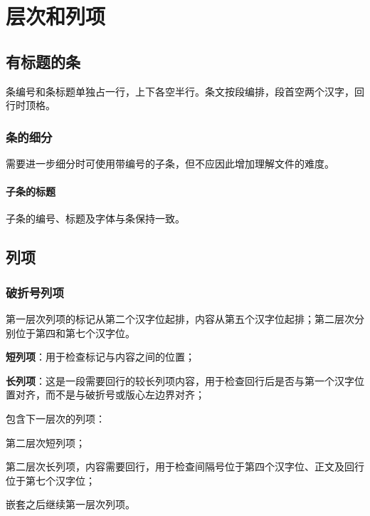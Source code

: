 \chapter{层次和列项}
\section{有标题的条}
条编号和条标题单独占一行，上下各空半行。条文按段编排，段首空两个汉字，回行时顶格。

\subsection{条的细分}
需要进一步细分时可使用带编号的子条，但不应因此增加理解文件的难度。

\subsubsection{子条的标题}
子条的编号、标题及字体与条保持一致。


\section{列项}
\subsection{破折号列项}
第一层次列项的标记从第二个汉字位起排，内容从第五个汉字位起排；第二层次分别位于第四和第七个汉字位。
\begin{stdlist}
    \item \textbf{短列项}：用于检查标记与内容之间的位置；
    \item \textbf{长列项}：这是一段需要回行的较长列项内容，用于检查回行后是否与第一个汉字位置对齐，而不是与破折号或版心左边界对齐；
    \item 包含下一层次的列项：
    \begin{stdlist}
        \item 第二层次短列项；
        \item 第二层次长列项，内容需要回行，用于检查间隔号位于第四个汉字位、正文及回行位于第七个汉字位；
    \end{stdlist}
    \item 嵌套之后继续第一层次列项。
\end{stdlist}

